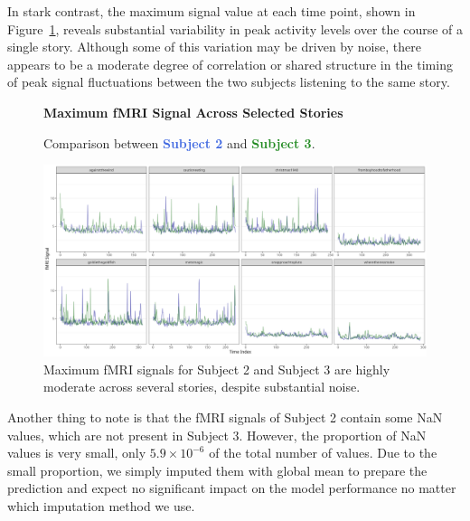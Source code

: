 \documentclass[10pt,letterpaper]{article}
\begin{document}
In stark contrast, the maximum signal value at each time point, shown in Figure~\ref{fig:max_signal}, reveals substantial variability in peak activity levels over the course of a single story. Although some of this variation may be driven by noise, there appears to be a moderate degree of correlation or shared structure in the timing of peak signal fluctuations between the two subjects listening to the same story.

\begin{figure}[ht]
    \centering
    \parbox{\textwidth}{\centering 
        \fontsize{13pt}{13pt}\selectfont \textbf{Maximum fMRI Signal Across Selected Stories}  

        {\fontsize{11pt}{13pt}\selectfont Comparison between \textcolor{RoyalBlue}{\textbf{Subject 2}} and \textcolor{ForestGreen}{\textbf{Subject 3}}.} 
    }
    \includegraphics[width=\textwidth]{figs/max_signal.png}
    \caption{Maximum fMRI signals for Subject 2 and Subject 3 are highly moderate across several stories, despite substantial noise.}
    \label{fig:max_signal}
\end{figure}

Another thing to note is that the fMRI signals of Subject 2 contain some NaN values, which are not present in Subject 3. However, the proportion of NaN values is very small, only \(5.9 \times 10^{-6}\) of the total number of values. Due to the small proportion, we simply imputed them with global mean to prepare the prediction and expect no significant impact on the model performance no matter which imputation method we use.
\end{document}
